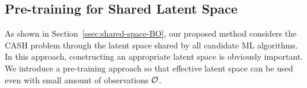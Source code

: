 %



\subsection{Pre-training for Shared Latent Space}
\label{ssec:pre-train}

As shown in Section~\ref{ssec:shared-space-BO}, our proposed method considers the CASH problem through the latent space shared by all candidate ML algorithms.
%
In this approach, constructing an appropriate latent space is obviously important.
%
We introduce a pre-training approach so that effective latent space can be used even with small amount of observations ${\mathcal O}$.


